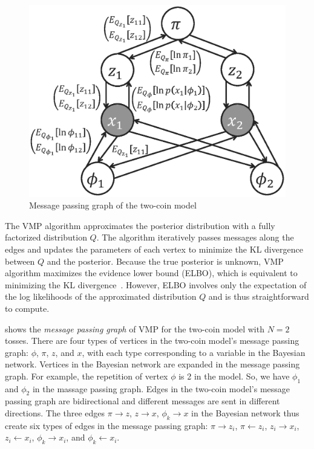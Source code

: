 \begin{figure}[ht]
	\centering
	\includegraphics[scale=0.4]{figs/two_coins_mpg.eps}
	\caption{Message passing graph of the two-coin model}
	\label{fig:two_coins_mpg}
\end{figure}

The VMP algorithm approximates the posterior distribution with a fully
factorized distribution $Q$. 
The algorithm iteratively passes messages along
the edges and updates the parameters of each vertex to minimize the KL divergence
between $Q$ and the posterior.  
Because the true posterior is unknown, VMP algorithm maximizes the
evidence lower bound (ELBO), which is equivalent to minimizing the KL
divergence~\cite{vmp}. However, ELBO involves only the expectation 
of the log likelihoods of the approximated distribution $Q$ and 
is thus straightforward to compute. 

 shows the \emph{message passing graph} of
VMP for the two-coin model with $N=2$ tosses.
There are four types of vertices in the two-coin model's message passing graph: $\phi$, $\pi$, $z$, and $x$, 
with each type corresponding to a variable in the Bayesian network.
Vertices in the Bayesian network are expanded in the message passing graph.
For example, the repetition of vertex $\phi$ is 2 in the model.
So, we have $\phi_1$ and $\phi_2$ in the massage passing graph.
Edges in the two-coin model's message passing graph are bidirectional
and different messages are sent in different directions.
The three edges $\pi \rightarrow z$, 
$z \rightarrow x$, $\phi_k \rightarrow x$ in the Bayesian network
thus create six types of edges in the message passing graph:
$\pi \rightarrow z_i$, 
$\pi \leftarrow z_i$, 
$z_i \rightarrow x_i$, 
$z_i \leftarrow x_i$, 
$\phi_k \rightarrow x_i$, and
$\phi_k \leftarrow x_i$.

